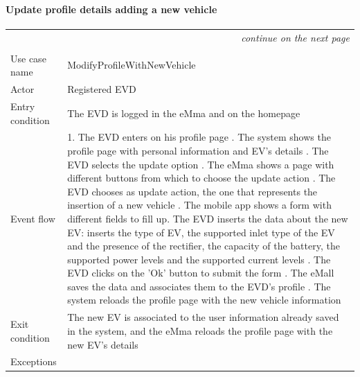 \paragraph{Update profile details adding a new vehicle}
\begin{center}
    \begin{longtable}{p{4cm} p{11cm}}
    \multicolumn{2}{r}{\itshape{continue on the next page}}\\
    \endfoot 
    \\
    \endlastfoot
    \hline
     Use case name &  ModifyProfileWithNewVehicle\\
     \hline
     Actor & Registered EVD \\
     \hline
     Entry condition & The EVD is logged in the eMma and on the homepage \\
     \hline
     Event flow &   1. The EVD enters on his profile page \newline
                    2. The system shows the profile page with personal information and EV's details \newline
                    3. The EVD selects the update option \newline
                    4. The eMma shows a page with different buttons from which to choose the update action \newline
                    5. The EVD chooses as update action, the one that represents the insertion of a new vehicle \newline
                    6. The mobile app shows a form with different fields to fill up\newline
                    7. The EVD inserts the data about the new EV: inserts the type of EV, the supported inlet type of the EV and the presence of the rectifier, the capacity of the battery, the supported power levels and the supported current levels \newline
                    8. The EVD clicks on the 'Ok' button to submit the form \newline
                    9. The eMall saves the data and associates them to the EVD's profile \newline
                    10. The system reloads the profile page with the new vehicle information \\
     \hline
     Exit condition &  The new EV is associated to the user information already saved in the system, and the eMma reloads the profile page with the new EV's details\\
     \hline
     Exceptions &   

\end{longtable}
\end{center}
